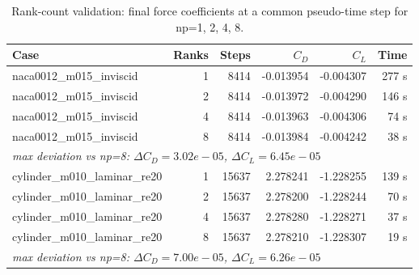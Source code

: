 \begin{table}[ht]
\centering
\caption{Rank-count validation: final force coefficients at a common pseudo-time step for np=1, 2, 4, 8.}
\label{tab:rankcheck}
\begin{tabular}{lrrrrr}
\toprule
Case & Ranks & Steps & $C_D$ & $C_L$ & Time \\
\midrule
naca0012\_m015\_inviscid & 1 & 8414 & -0.013954 & -0.004307 & 277 s \\
naca0012\_m015\_inviscid & 2 & 8414 & -0.013972 & -0.004290 & 146 s \\
naca0012\_m015\_inviscid & 4 & 8414 & -0.013963 & -0.004306 & 74 s \\
naca0012\_m015\_inviscid & 8 & 8414 & -0.013984 & -0.004242 & 38 s \\
\multicolumn{6}{l}{\em max deviation vs np=8: $\Delta C_D=3.02e-05$, $\Delta C_L=6.45e-05$} \\
cylinder\_m010\_laminar\_re20 & 1 & 15637 & 2.278241 & -1.228255 & 139 s \\
cylinder\_m010\_laminar\_re20 & 2 & 15637 & 2.278200 & -1.228244 & 70 s \\
cylinder\_m010\_laminar\_re20 & 4 & 15637 & 2.278280 & -1.228271 & 37 s \\
cylinder\_m010\_laminar\_re20 & 8 & 15637 & 2.278210 & -1.228307 & 19 s \\
\multicolumn{6}{l}{\em max deviation vs np=8: $\Delta C_D=7.00e-05$, $\Delta C_L=6.26e-05$} \\
\bottomrule
\end{tabular}
\end{table}

